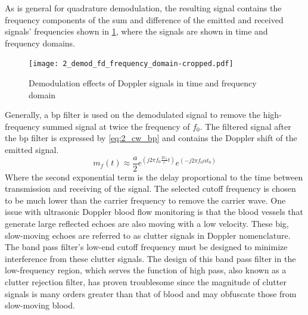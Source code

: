 As is general for quadrature demodulation, the resulting signal contains the frequency components of the sum and difference of the emitted and received signals' frequencies shown in \cref{fig:2_demod_fd_frequency_domain}, where the signals are shown in time and frequency domains.

\begin{figure}[htbp]
	\centering
	\texttt{[image: 2\_demod\_fd\_frequency\_domain-cropped.pdf]}
	\caption[Demodulation effects of Doppler signals in time and frequency domain]{Demodulation effects of Doppler signals in time and frequency domain \cite{ShungUltrasound_Book}}
	\label{fig:2_demod_fd_frequency_domain}
\end{figure}

Generally, a \gls{bp} filter is used on the demodulated signal to remove the high-frequency summed signal at twice the frequency of $f_{0}$. The filtered signal after the \gls{bp} filter is expressed by \cref{eq:2_cw_bp} and contains the Doppler shift of the emitted signal.
\begin{equation} \label{eq:2_cw_bp}
	m_{f}(t) \approx \frac{a}{2} e^{\left(j2\pi f_{0} \frac{2v_{z}}{c}t\right)} e^{\left( -j2\pi f_{0} \alpha t_{0} \right)}
\end{equation}
Where the second exponential term is the delay proportional to the time between transmission and receiving of the signal. The selected cutoff frequency is chosen to be much lower than the carrier frequency to remove the carrier wave. One issue with ultrasonic Doppler blood flow monitoring is that the blood vessels that generate large reflected echoes are also moving with a low velocity. These big, slow-moving echoes are referred to as clutter signals in Doppler nomenclature. The band pass filter's low-end cutoff frequency must be designed to minimize interference from these clutter signals. The design of this band pass filter in the low-frequency region, which serves the function of high pass, also known as a clutter rejection filter, has proven troublesome since the magnitude of clutter signals is many orders greater than that of blood and may obfuscate those from slow-moving blood.

